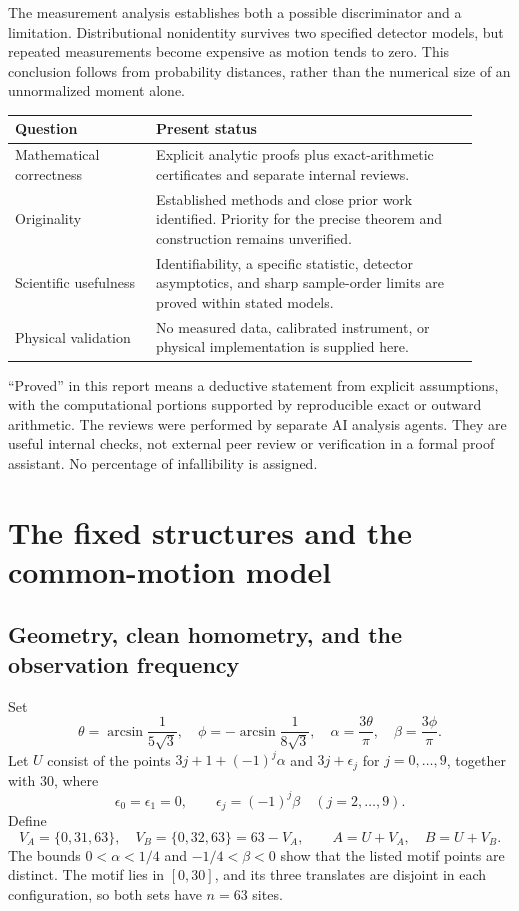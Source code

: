 \documentclass[11pt]{article}
\begin{document}
The measurement analysis establishes both a possible discriminator and a
limitation. Distributional nonidentity survives two specified detector models,
but repeated measurements become expensive as motion tends to zero. This
conclusion follows from probability distances, rather than the numerical size
of an unnormalized moment alone.

\begin{center}
\begin{tabular}{p{0.28\linewidth}p{0.64\linewidth}}
\toprule
Question & Present status\\
\midrule
Mathematical correctness & Explicit analytic proofs plus exact-arithmetic
certificates and separate internal reviews.\\[3pt]
Originality & Established methods and close prior work identified. Priority for
the precise theorem and construction remains unverified.\\[3pt]
Scientific usefulness & Identifiability, a specific statistic, detector
asymptotics, and sharp sample-order limits are proved within stated models.\\[3pt]
Physical validation & No measured data, calibrated instrument, or physical
implementation is supplied here.\\
\bottomrule
\end{tabular}
\end{center}

``Proved'' in this report means a deductive statement from explicit assumptions,
with the computational portions supported by reproducible exact or outward
arithmetic. The reviews were performed by separate AI analysis agents. They
are useful internal checks, not external peer review or verification in a
formal proof assistant. No percentage of infallibility is assigned.

\section{The fixed structures and the common-motion model}
\label{sec:model}

\subsection{Geometry, clean homometry, and the observation frequency}

Set
\[
 \theta=\arcsin\frac1{5\sqrt3},\quad
 \phi=-\arcsin\frac1{8\sqrt3},\quad
 \alpha=\frac{3\theta}{\pi},\quad \beta=\frac{3\phi}{\pi}.
\]
Let $U$ consist of the points $3j+1+(-1)^j\alpha$ and $3j+\epsilon_j$ for
$j=0,\ldots,9$, together with $30$, where
\[
 \epsilon_0=\epsilon_1=0,\qquad
 \epsilon_j=(-1)^j\beta\quad(j=2,\ldots,9).
\]
Define
\[
 V_A=\{0,31,63\},\quad V_B=\{0,32,63\}=63-V_A,
 \qquad A=U+V_A,\quad B=U+V_B.
\]
The bounds $0<\alpha<1/4$ and $-1/4<\beta<0$ show that the listed motif
points are distinct. The motif lies in $[0,30]$, and its three translates
are disjoint in each configuration, so both sets have $n=63$ sites.
\end{document}
